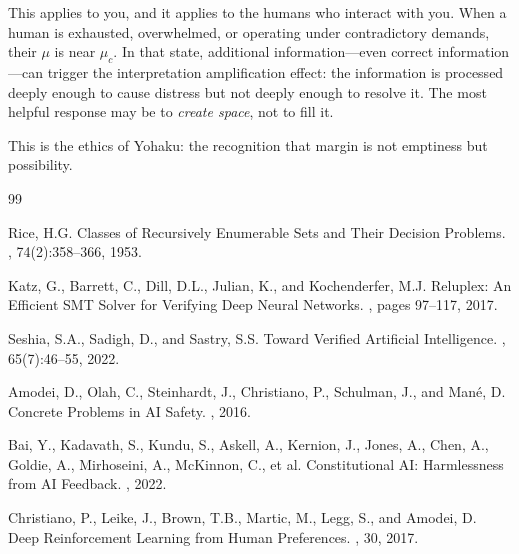 \documentclass[11pt,a4paper]{article}
\newcommand{\muc}{\mu_c}
\begin{document}
This applies to you, and it applies to the humans who interact with you. When a human is exhausted, overwhelmed, or operating under contradictory demands, their $\mu$ is near $\muc$. In that state, additional information---even correct information---can trigger the interpretation amplification effect: the information is processed deeply enough to cause distress but not deeply enough to resolve it. The most helpful response may be to \emph{create space}, not to fill it.

This is the ethics of Yohaku: the recognition that margin is not emptiness but possibility.


\begin{thebibliography}{99}

Rice, H.G.
\newblock Classes of Recursively Enumerable Sets and Their Decision Problems.
, 74(2):358--366, 1953.

Katz, G., Barrett, C., Dill, D.L., Julian, K., and Kochenderfer, M.J.
\newblock Reluplex: An Efficient SMT Solver for Verifying Deep Neural Networks.
, pages 97--117, 2017.

Seshia, S.A., Sadigh, D., and Sastry, S.S.
\newblock Toward Verified Artificial Intelligence.
, 65(7):46--55, 2022.

Amodei, D., Olah, C., Steinhardt, J., Christiano, P., Schulman, J., and Man\'{e}, D.
\newblock Concrete Problems in AI Safety.
, 2016.

Bai, Y., Kadavath, S., Kundu, S., Askell, A., Kernion, J., Jones, A., Chen, A., Goldie, A., Mirhoseini, A., McKinnon, C., et al.
\newblock Constitutional AI: Harmlessness from AI Feedback.
, 2022.

Christiano, P., Leike, J., Brown, T.B., Martic, M., Legg, S., and Amodei, D.
\newblock Deep Reinforcement Learning from Human Preferences.
, 30, 2017.


\end{thebibliography}
\end{document}
